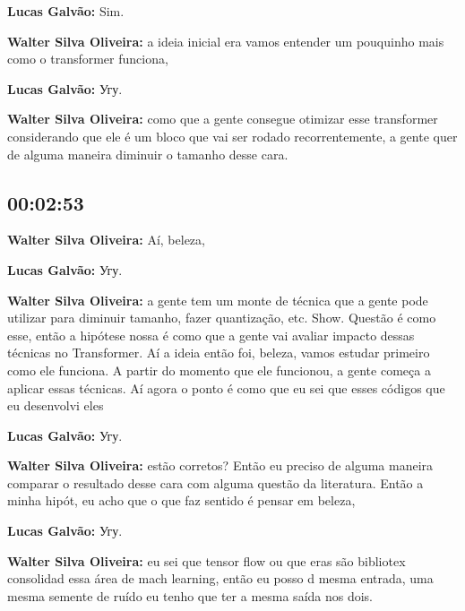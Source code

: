 \textbf{Lucas Galvão:} Sim.



\textbf{Walter Silva Oliveira:} a ideia inicial era vamos entender um pouquinho mais como o transformer funciona,



\textbf{Lucas Galvão:} Угу.



\textbf{Walter Silva Oliveira:} como que a gente consegue otimizar esse transformer considerando que ele é um bloco que vai ser rodado recorrentemente, a gente quer de alguma maneira diminuir o tamanho desse cara.



\subsection{\textbf{00:02:53}}



\textbf{Walter Silva Oliveira:} Aí, beleza,



\textbf{Lucas Galvão:} Угу.



\textbf{Walter Silva Oliveira:} a gente tem um monte de técnica que a gente pode utilizar para diminuir tamanho, fazer quantização, etc. Show. Questão é como esse, então a hipótese nossa é como que a gente vai avaliar impacto dessas técnicas no Transformer. Aí a ideia então foi, beleza, vamos estudar primeiro como ele funciona. A partir do momento que ele funcionou, a gente começa a aplicar essas técnicas. Aí agora o ponto é como que eu sei que esses códigos que eu desenvolvi eles



\textbf{Lucas Galvão:} Угу.



\textbf{Walter Silva Oliveira:} estão corretos? Então eu preciso de alguma maneira comparar o resultado desse cara com alguma questão da literatura. Então a minha hipót, eu acho que o que faz sentido é pensar em beleza,



\textbf{Lucas Galvão:} Угу.



\textbf{Walter Silva Oliveira:} eu sei que tensor flow ou que eras são bibliotex consolidad essa área de mach learning, então eu posso d mesma entrada, uma mesma semente de ruído eu tenho que ter a mesma saída nos dois.



